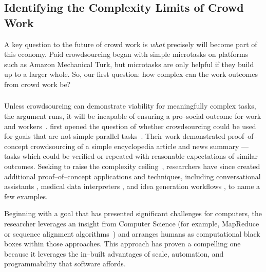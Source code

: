 \documentclass[trackingWork]{subfiles}
\begin{document}
\begin{comment}
Crowdwork
  - Kittur said let's do complex stuff
  - This works by using CS techniques
  - Clear that this works in focused cases
  - More recent shift toward using experts
\end{comment}

\subsection[What are the complexity limits of crowd work]
{Identifying the Complexity Limits of Crowd Work}\label{sec:complexity}
A key question to the future of crowd work is
\textit{what} precisely will become part of this economy.
Paid crowdsourcing began with simple microtasks on platforms such as
Amazon Mechanical Turk, but
microtasks are only helpful if they build up to a larger whole.
So, our first question:
how complex can the work outcomes from crowd work be?

\subsubsection{\crowdworkpers}

Unless crowdsourcing can demonstrate viability for meaningfully complex tasks,
the argument runs,
it will be incapable of ensuring a pro--social outcome for work and workers~\cite{crowdworkFuture}.
\citeauthor{crowdForgeKittur} first opened the question of
whether crowdsourcing could be used for goals that are not simple parallel tasks~\cite{crowdForgeKittur}.
Their work demonstrated proof--of--concept crowdsourcing of
a simple encyclopedia article and news summary
--- tasks which could be verified or repeated
with reasonable expectations of similar outcomes.
Seeking to raise the complexity ceiling~\cite{myers2000past},
researchers have since created
additional proof--of--concept applications and techniques,
including conversational assistants \cite{Lasecki:2013:CCC:2501988.2502057},
medical data interpreters \cite{Lasecki:2013:CCC:2501988.2502057}, and
idea generation workflows \cite{YuEncouragingOutside,yu2014distributed,Yu2016a},
to name a few examples.

Beginning with a goal that has
presented significant challenges for computers,
the researcher leverages an insight from Computer Science
(for example, MapReduce~\cite{crowdForgeKittur} or
sequence alignment algorithms~\cite{lasecki2012real})
and arranges humans as computational black boxes within those approaches.
This approach has proven a compelling one because
it leverages the in--built advantages of
scale,
automation, and
programmability that software affords.
\end{document}
